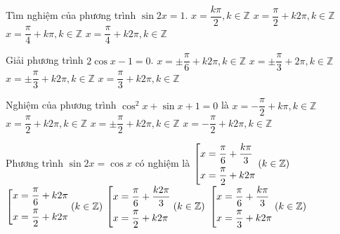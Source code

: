\begin{ex}%
	Tìm nghiệm của phương trình $ \sin 2x=1 $.
	\choice
	{$ x=\dfrac{k\pi}{2},  k\in \mathbb{Z} $}
	{$ x=\dfrac{\pi}{2}+k2\pi,  k\in \mathbb{Z} $}
	{\True $ x=\dfrac{\pi}{4}+k\pi,  k\in \mathbb{Z} $}
	{$ x=\dfrac{\pi}{4}+k2\pi,  k\in \mathbb{Z}$}
\end{ex}
\begin{ex}%
	Giải phương trình $ 2\cos x-1=0 $.
	\choice
	{$x=\pm \dfrac{\pi}{6}+k2\pi, k\in \mathbb{Z} $}
	{$x=\pm \dfrac{\pi}{3}+2\pi, k\in \mathbb{Z}  $}
	{\True $x=\pm \dfrac{\pi}{3}+k2\pi, k\in \mathbb{Z}  $}
	{$x= \dfrac{\pi}{3}+k2\pi, k\in \mathbb{Z} $}
\end{ex}
\begin{ex}%
	Nghiệm của phương trình $ \cos^2 x+\sin x+1=0 $ là
	\choice
	{$x=- \dfrac{\pi}{2}+k\pi, k\in \mathbb{Z} $}
	{$x=\dfrac{\pi}{2}+k2\pi, k\in \mathbb{Z}  $}
	{$x=\pm \dfrac{\pi}{2}+k2\pi, k\in \mathbb{Z}  $}
	{\True $x=-\dfrac{\pi}{2}+k2\pi, k\in \mathbb{Z} $}
\end{ex}
\begin{ex}%
	Phương trình $ \sin 2x=\cos x $ có nghiệm là
	\choice
	{$\left[\begin{aligned}&x=\dfrac{\pi}{6}+\dfrac{k\pi}{3}\\&x=\dfrac{\pi}{2}+k2\pi\end{aligned}\right. ( k\in \mathbb{Z}) $}
	{$\left[\begin{aligned}&x=\dfrac{\pi}{6}+k2\pi\\&x=\dfrac{\pi}{2}+k2\pi\end{aligned}\right. ( k\in \mathbb{Z}) $}
	{\True $\left[\begin{aligned}&x=\dfrac{\pi}{6}+\dfrac{k2\pi}{3}\\&x=\dfrac{\pi}{2}+k2\pi\end{aligned}\right. ( k\in \mathbb{Z}) $}
	{$\left[\begin{aligned}&x=\dfrac{\pi}{6}+\dfrac{k\pi}{3}\\&x=\dfrac{\pi}{3}+k2\pi\end{aligned}\right. ( k\in \mathbb{Z}) $}
\end{ex}
